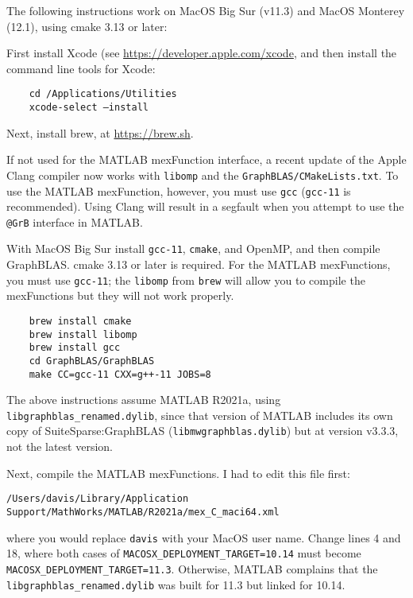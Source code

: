 \documentclass[12pt]{article}
\begin{document}
{The following instructions work on MacOS Big Sur (v11.3)
and MacOS Monterey (12.1), using
cmake 3.13 or later:

First install Xcode (see \url{https://developer.apple.com/xcode},
and then install the command line tools for Xcode:

    {\small
    \begin{verbatim}
    cd /Applications/Utilities
    xcode-select —install \end{verbatim} }

Next, install brew, at \url{https://brew.sh}.

If not used for the MATLAB mexFunction interface, a recent update of the Apple
Clang compiler now works with \verb'libomp' and the
\verb'GraphBLAS/CMakeLists.txt'.  To use the MATLAB mexFunction, however, you
must use \verb'gcc' (\verb'gcc-11' is recommended).  Using Clang will result in
a segfault when you attempt to use the \verb'@GrB' interface in MATLAB.

With MacOS Big Sur install \verb'gcc-11', \verb'cmake', and OpenMP, and then
compile GraphBLAS.  cmake 3.13 or later is required.  For the MATLAB
mexFunctions, you must use \verb'gcc-11'; the \verb'libomp' from \verb'brew'
will allow you to compile the mexFunctions but they will not work properly.

    {\small
    \begin{verbatim}
    brew install cmake
    brew install libomp
    brew install gcc
    cd GraphBLAS/GraphBLAS
    make CC=gcc-11 CXX=g++-11 JOBS=8 \end{verbatim} }

The above instructions assume MATLAB R2021a, using
\verb'libgraphblas_renamed.dylib', since that version of MATLAB includes its
own copy of SuiteSparse:GraphBLAS (\verb'libmwgraphblas.dylib') but at version
v3.3.3, not the latest version.

Next, compile the MATLAB mexFunctions.  I had to edit this file first:

{\small
\begin{verbatim}
/Users/davis/Library/Application Support/MathWorks/MATLAB/R2021a/mex_C_maci64.xml \end{verbatim} }

where you would replace \verb'davis' with your MacOS user name.
Change lines 4 and 18, where both cases of \verb'MACOSX_DEPLOYMENT_TARGET=10.14'
must become \verb"MACOSX_DEPLOYMENT_TARGET=11.3".  Otherwise, MATLAB
complains that the \verb'libgraphblas_renamed.dylib' was built for 11.3 but
linked for 10.14.

}
\end{document}
